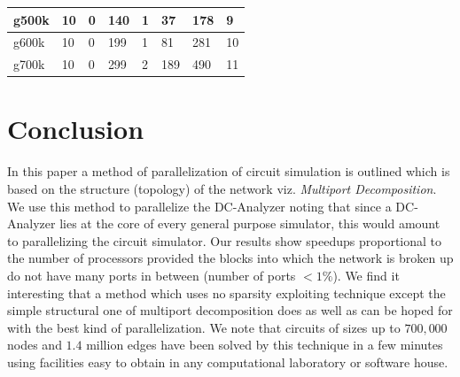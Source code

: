 \documentclass[12pt,psfig,a4]{article}
\begin{document}
\begin{table}[ht]
\begin{center}
\begin{tabular}{|l|l|l|l|l|l|l|l|}
g500k& \hspace{0.2in}10& \hspace{0.2in}0 & \hspace{0.2in}140 & \hspace{0.2in}1 & \hspace{0.2in}37& \hspace{0.2in}178& \hspace{0.2in} 9 \\ \hline 
g600k& \hspace{0.2in}10& \hspace{0.2in}0 & \hspace{0.2in}199 & \hspace{0.2in}1 & \hspace{0.2in}81& \hspace{0.2in}281& \hspace{0.2in} 10\\ \hline 
g700k& \hspace{0.2in}10& \hspace{0.2in}0 & \hspace{0.2in}299 & \hspace{0.2in}2 & \hspace{0.2in}189& \hspace{0.2in}490& \hspace{0.2in}11\\ \hline 
\end {tabular}
\end {center}
\end {table}
\normalsize


\section{Conclusion}
In this paper a method of parallelization of circuit simulation
is outlined which is based on the structure (topology) of the network
viz. {\it Multiport Decomposition}.
We use this method to parallelize the DC-Analyzer noting that 
since a DC-Analyzer lies at the core of every general purpose simulator, this would amount
to parallelizing the circuit simulator.
Our results show speedups proportional to the number of processors
provided the blocks into which the network is broken up do
not have many ports in between (number of ports $< 1\%$).
We find it interesting that a method which uses no 
sparsity exploiting technique except the simple structural one 
of multiport decomposition does as well as can be hoped for with the best 
kind of parallelization. We note that circuits of sizes up to $700,000$ nodes
and $1.4$ million edges have been solved by this technique in a few minutes using
facilities easy to obtain in any computational laboratory or
software house.
\end{document}
